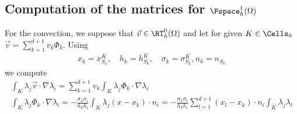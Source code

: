 \subsection{Computation of the matrices for $\Pspace_h^1(\Omega)$}\label{subsec:}
%
For the convection, we suppose that $\vec{v}\in \RT^0_h(\Omega)$ and let for given $K\in\Cells_h$ 
$\vec{v}=\sum_{k=1}^{d+1} v_k \Phi_k$. Using
%
\begin{align*}
x_k = x_{S_k}^K,\quad h_k = h_{S_k}^K, \quad \sigma_k = \sigma_{S_k}^K, n_k = n_{S_k}
\end{align*}
%
we compute
%
\begin{align*}
\int_K \lambda_j \vec{v}\cdot \nabla \lambda_i = \sum_{k=1}^{d+1} v_k \int_K \lambda_j \Phi_k\cdot \nabla \lambda_i\\
\int_K \lambda_j \Phi_k\cdot \nabla \lambda_i = -\frac{\sigma_k \sigma_i}{h_kh_i} \int_K  \lambda_j (x-x_k) \cdot n_i
= -\frac{\sigma_k \sigma_i}{h_kh_i} \sum_{l=1}^{d+1} (x_l-x_k) \cdot n_i \int_K  \lambda_j\lambda_l 
\end{align*}
%




\printbibliography[title=References Section~\thesection]



